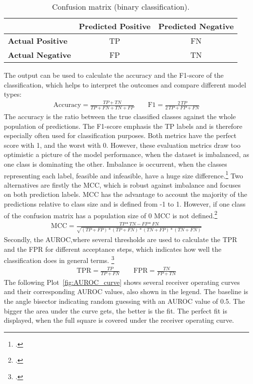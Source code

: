\begin{table}[ht]
    \centering
    \begin{tabular}{@{}lcc@{}}
        \toprule
                                 & \textbf{Predicted Positive} & \textbf{Predicted Negative} \\
        \midrule
        \textbf{Actual Positive} & \Gls{TP}                    & \Gls{FN}                    \\
        \textbf{Actual Negative} & \Gls{FP}                    & \Gls{TN}                    \\
        \bottomrule
    \end{tabular}
    \caption{Confusion matrix (binary classification).}
    \label{tab:confusion_matrix}
\end{table}
The output can be used to calculate the accuracy and the F1-score of the classification, which
helps to interpret the outcomes and compare different model types:
\begin{align}
    \text{Accuracy}=\frac{TP+TN}{TP+FN+TN+FP}
    \qquad
    \text{F1}=\frac{2\,TP}{2\,TP+FP+FN}
\end{align}
The accuracy is the ratio between the true classified classes against the whole population
of predictions. The F1-score emphasis the \gls{TP} labels and is therefore especially
often used for classification purposes. Both metrics have the perfect score with 1, and the worst with 0.
However, these evaluation metrics draw too optimistic a picture of the model performance,
when the dataset is imbalanced, as one class is dominating the other. Imbalance is occurrent,
when the classes representing each label, feasible and infeasible, have a huge size difference.\footcite[cf.][p. 2f.]{chicco_advantages_2020}
Two alternatives are firstly the \gls{MCC}, which is robust against imbalance
and focuses on both prediction labels. \gls{MCC} has the advantage to account the majority of the predictions
relative to class size and is defined from -1 to 1. However, if one class of the confusion
matrix has a population size of 0 \gls{MCC} is not defined.\footcite[cf.][p.5]{chicco_advantages_2020}
\begin{align}
    \text{MCC}=\frac{TP*TN - FP*FN}{\sqrt{(TP+FP)*(TP+FN)*(TN+FP)*(TN+FN)}}
\end{align}
Secondly, the \gls{AUROC},where several thresholds are used
to calculate the \gls{TPR} and the \gls{FPR} for different acceptance steps,
which indicates how well the classification does in general terms. \footcite[cf.][p.2f.]{chicco_advantages_2020}
\begin{align}
    \text{TPR}=\frac{TP}{TP+FN}
    \qquad
    \text{FPR}=\frac{TN}{FP+TN}
\end{align}
The following Plot~\ref{fig:AUROC_curve} shows several receiver operating curves and their corresponding \gls{AUROC} values, also shown
in the legend. The baseline is the angle bisector indicating random guessing with an \gls{AUROC} value of 0.5. The bigger the area under the
curve gets, the better is the fit. The perfect fit is displayed, when the full square is covered under the receiver operating curve.

